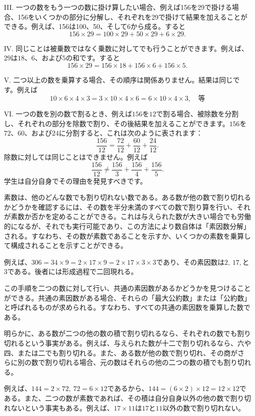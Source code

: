 \documentclass[a4paper,11pt,openany]{ltjsbook}
\begin{document}
III. 一つの数をもう一つの数に掛け算したい場合、例えば156を29で掛ける場合、156をいくつかの部分に分解し、それぞれを29で掛けて結果を加えることができる。例えば、156は100、50、そして6から成る。すると
\[
156 × 29 = 100 × 29 + 50 × 29 + 6 × 29.
\]

IV. 同じことは被乗数ではなく乗数に対してでも行うことができます。例えば、$29$は$18$、$6$、および$5$の和です。すると
\[
156 × 29 = 156 × 18 + 156 × 6 + 156 × 5.
\]

V. 二つ以上の数を乗算する場合、その順序は関係ありません。結果は同じです。例えば
\[
10 × 6 × 4 × 3 = 3 × 10 × 4 × 6 = 6 × 10 × 4 × 3, \quad\text{等}
\]

VI. 一つの数を別の数で割るとき、例えば$156$を$12$で割る場合、被除数を分割し、それぞれの部分を除数で割り、その後結果を加えることができます。$156$を$72$、$60$、および$24$に分割すると、これは次のように表されます：
\[
\frac{156}{12} = \frac{72}{12} + \frac{60}{12} + \frac{24}{12}.
\]
除数に対しては同じことはできません。例えば
\[
\frac{156}{12} ≠ \frac{156}{3} + \frac{156}{4} + \frac{156}{5}.
\]
学生は自分自身でその理由を発見すべきです。

素数は、他のどんな数でも割り切れない数である。ある数が他の数で割り切れるかどうかを確認するには、その数を半分未満のすべての数で割り算を行い、それが素数か否かを定めることができる。これは与えられた数が大きい場合でも労働的になるが、それでも実行可能であり、この方法により数自体は「素因数分解」される。すなわち、その数が素数であることを示すか、いくつかの素数を乗算して構成されることを示すことができる。

例えば、$306 = 34 \times 9 = 2 \times 17 \times 9 = 2 \times 17 \times 3 \times 3$であり、その素因数は$2,~17,$と$3$である。後者には形成過程で二回現れる。

この手順を二つの数に対して行い、共通の素因数があるかどうかを見つけることができる。共通の素因数がある場合、それらの「最大公約数」または「公約数」と呼ばれるものが求められる。すなわち、すべての共通の素因数を乗算した数である。

明らかに、ある数が二つの他の数の積で割り切れるなら、それぞれの数でも割り切れるという事実がある。例えば、与えられた数が十二で割り切れるなら、六や四、または二でも割り切れる。また、ある数が他の数で割り切れ、その商がさらに別の数で割り切れる場合、元の数はそれらの他の二つの数の積でも割り切れる。

例えば、$144 = 2 \times 72,~72 = 6 \times 12$であるから、$144 = (6 \times 2) \times 12 = 12 \times 12$である。また、二つの数が素数であれば、その積は自分自身以外の他の数で割り切れないという事実もある。例えば、$17 \times 11$は$17$と$11$以外の数で割り切れない。
\end{document}
